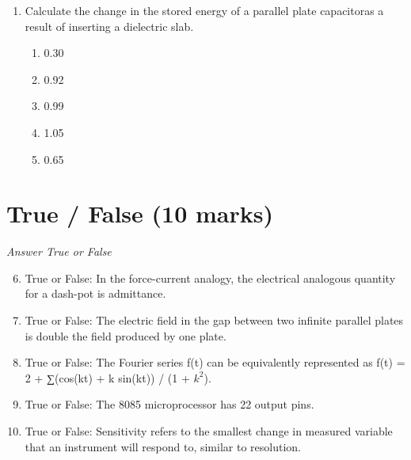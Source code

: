 \documentclass[12pt]{article}
\begin{document}
\begin{enumerate}[label=\arabic*.]
\begin{enumerate}[label=(\alph*)]
    \item L\{$t^nu(t$)\} = [n! / ($s^(n$+3))]
    \item L\{$t^nu(t$)\} = [(n+1)! / ($s^(n$+1))]
    \item L\{$t^nu(t$)\} = [n! / ($s^n$)]
    \item L\{$t^nu(t$)\} = [n! / ($s^n$+ 2)]
    \item L\{$t^nu(t$)\} = [n! / ($s^n$+ 1)]
\end{enumerate}
\item Calculate the change in the stored energy of a parallel plate capacitoras a result of inserting a dielectric slab.
\begin{enumerate}[label=(\alph*)]
    \item 0.30
    \item 0.92
    \item 0.99
    \item 1.05
    \item 0.65
\end{enumerate}
\end{enumerate}

\section*{True / False (10 marks)}
\textit{Answer True or False}
\begin{enumerate}[label=\arabic*.]
\setcounter{enumi}{5}
\item True or False: In the force-current analogy, the electrical analogous quantity for a dash-pot is admittance.
\item True or False: The electric field in the gap between two infinite parallel plates is double the field produced by one plate.
\item True or False: The Fourier series f(t) can be equivalently represented as f(t) = 2 + ∑(cos(kt) + k sin(kt)) / (1 + $k^2$).
\item True or False: The 8085 microprocessor has 22 output pins.
\item True or False: Sensitivity refers to the smallest change in measured variable that an instrument will respond to, similar to resolution.
\end{enumerate}
\end{document}
